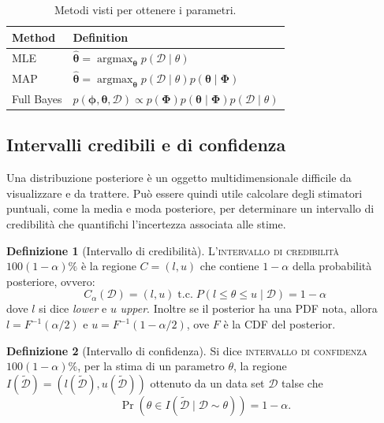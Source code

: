 \documentclass[10pt]{article}
\DeclareMathOperator{\pr}{Pr}
\DeclareMathOperator*{\argmax}{argmax}
\renewcommand{\vec}[1]{\boldsymbol{#1}}
\newcommand{\im}[1]{\textsc{#1}}
\newcommand{\cond}{\mid}
\newcommand{\tc}{\ensuremath{\;\text{t.c.}\;}}
\theoremstyle{definition}
\newtheorem{definition}{Definizione}[section]
\begin{document}
    \begin{table}[]
        \centering\begin{tabular}{ll}
            \toprule
            Method & Definition \\
            \midrule
            MLE & \( \hat{\vec{\theta}} = \argmax_{\vec{\theta}} p \left( \mathcal{D}\cond \theta \right) \) \\
            MAP & \( \hat{\vec{\theta}} = \argmax_{\vec{\theta}} p \left( \mathcal{D}\cond \theta \right) p \left( \vec{\theta} \cond \vec{\Phi} \right)\) \\
            Full Bayes & \( p \left( \vec{\phi}, \vec{\theta}, \mathcal{D} \right) \propto p \left( \vec{\Phi} \right) p \left( \vec{\theta} \cond \vec{\Phi}\right) p \left( \mathcal{D} \cond \theta \right) \) \\
            \bottomrule
        \end{tabular}
        \caption{Metodi visti per ottenere i parametri.}\label{tab:metodi-parametri}
    \end{table}

\subsection{Intervalli credibili e di confidenza}
    Una distribuzione posteriore è un oggetto multidimensionale difficile da
    visualizzare e da trattere. Può essere quindi utile calcolare degli
    stimatori puntuali, come la media e moda posteriore, per determinare un
    intervallo di credibilità che quantifichi l'incertezza associata alle stime.

    \begin{definition}[Intervallo di credibilità]
        L'\im{intervallo di credibilità} \(100\left( 1 - \alpha \right)\%\) è la regione \(C = \left( l, u \right)\)
        che contiene \( 1 - \alpha \) della probabilità posteriore, ovvero:
        \begin{equation}
            C_\alpha \left( \mathcal{D} \right) = \left( l, u \right) \tc P\left( l \leq \theta \leq u \cond \mathcal{D} \right) = 1 - \alpha
        \end{equation}
        dove \(l\) si dice \textit{lower} e \(u\) \textit{upper}. Inoltre se il posterior
        ha una PDF nota, allora \(l = F^{-1} \left( \alpha/2 \right) \) e \( u = F^{-1} \left( 1 - \alpha/2 \right)\),
        ove \(F\) è la CDF del posterior.
    \end{definition}

    \begin{definition}[Intervallo di confidenza]
        Si dice \im{intervallo di confidenza} \(100 \left( 1 - \alpha \right)\% \), per la stima di un
        parametro \(\theta\), la regione \(I ( \tilde{\mathcal{D}} ) = ( l( \mathcal{\tilde{D}} ), u( \mathcal{\tilde{D}} ) )\)
        ottenuto da un data set \(\mathcal{D}\) talse che
        \begin{equation}
            \pr \left( \theta \in I \left( \mathcal{\tilde{D}} \cond \mathcal{D} \sim \theta \right) \right) = 1 - \alpha.
        \end{equation}

    \end{definition}
\end{document}
